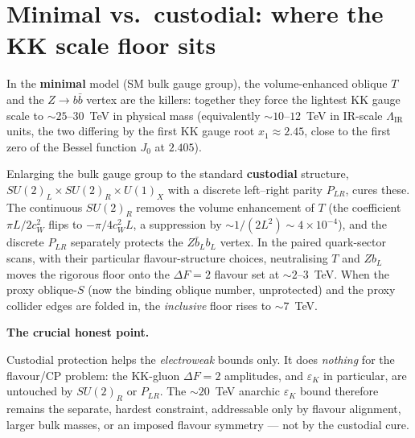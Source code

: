 \documentclass[11pt]{article}
\newenvironment{callout}[1]{%
  \par\medskip\begin{shaded}\noindent\textbf{#1}\par\smallskip}{\end{shaded}\medskip}
\newcommand{\LIR}{\Lambda_{\mathrm{IR}}}
\newcommand{\epsK}{\varepsilon_K}
\newcommand{\cwsq}{c_W^2}
\begin{document}
\section{Minimal vs.\ custodial: where the KK scale floor sits}

In the \textbf{minimal} model (SM bulk gauge group), the volume-enhanced oblique
$T$ and the $Z\to b\bar b$ vertex are the killers: together they force the
lightest KK gauge scale to $\sim 25$--$30$~TeV in physical mass (equivalently
$\sim 10$--$12$~TeV in IR-scale $\LIR$ units, the two differing by the first KK
gauge root $x_1\approx 2.45$, close to the first zero of the Bessel function
$J_0$ at $2.405$).

Enlarging the bulk gauge group to the standard \textbf{custodial} structure,
$SU(2)_L\times SU(2)_R\times U(1)_X$ with a discrete left--right parity
$P_{LR}$, cures these. The continuous $SU(2)_R$ removes the volume enhancement of
$T$ (the coefficient $\pi L/2\cwsq$ flips to $-\pi/4\cwsq L$, a suppression by
$\sim 1/(2L^2)\sim 4\times10^{-4}$), and the discrete $P_{LR}$ separately
protects the $Z\bar b_L b_L$ vertex. In the paired quark-sector scans, with their
particular flavour-structure choices, neutralising $T$ and $Z b_L$ moves the
rigorous floor onto the $\Delta F=2$ flavour set at $\sim 2$--$3$~TeV. When the
proxy oblique-$S$ (now the binding oblique number, unprotected) and the proxy
collider edges are folded in, the \emph{inclusive} floor rises to $\sim 7$~TeV.

\begin{callout}{The crucial honest point.}
Custodial protection helps the \emph{electroweak} bounds only. It does
\emph{nothing} for the flavour/CP problem: the KK-gluon $\Delta F=2$ amplitudes,
and $\epsK$ in particular, are untouched by $SU(2)_R$ or $P_{LR}$. The
$\sim 20$~TeV anarchic $\epsK$ bound therefore remains the separate, hardest
constraint, addressable only by flavour alignment, larger bulk masses, or an
imposed flavour symmetry --- not by the custodial cure.
\end{callout}
\end{document}
